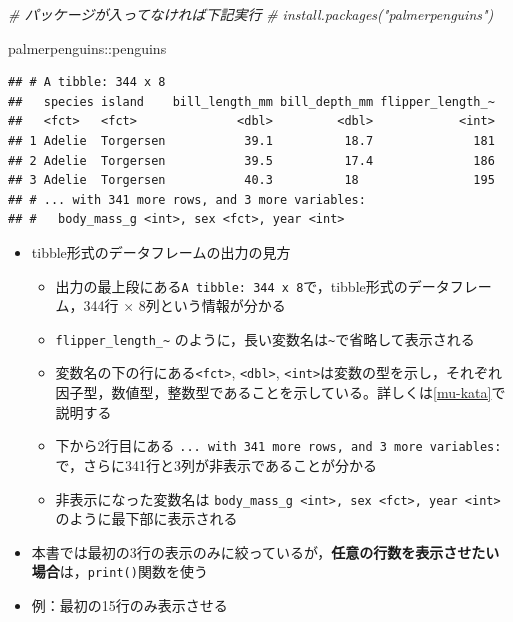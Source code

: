 \documentclass[
  xelatex,ja=standard, b5paper]{bxjsbook}
\newenvironment{Shaded}{\begin{snugshade}}{\end{snugshade}}
\newcommand{\CommentTok}[1]{\textcolor[rgb]{0.56,0.35,0.01}{\textit{#1}}}
\newcommand{\NormalTok}[1]{#1}
\newcommand{\SpecialCharTok}[1]{\textcolor[rgb]{0.00,0.00,0.00}{#1}}
\providecommand{\tightlist}{%
  \setlength{\itemsep}{0pt}\setlength{\parskip}{0pt}}
\begin{document}
\begin{Shaded}
\begin{Highlighting}[]
\CommentTok{\# パッケージが入ってなければ下記実行}
\CommentTok{\# install.packages("palmerpenguins")}

\NormalTok{palmerpenguins}\SpecialCharTok{::}\NormalTok{penguins}
\end{Highlighting}
\end{Shaded}

\begin{verbatim}
## # A tibble: 344 x 8
##   species island    bill_length_mm bill_depth_mm flipper_length_~
##   <fct>   <fct>              <dbl>         <dbl>            <int>
## 1 Adelie  Torgersen           39.1          18.7              181
## 2 Adelie  Torgersen           39.5          17.4              186
## 3 Adelie  Torgersen           40.3          18                195
## # ... with 341 more rows, and 3 more variables:
## #   body_mass_g <int>, sex <fct>, year <int>
\end{verbatim}

\begin{itemize}
\tightlist
\item
  tibble形式のデータフレームの出力の見方

  \begin{itemize}
  \tightlist
  \item
    出力の最上段にある\texttt{A\ tibble:\ 344\ x\ 8}で，tibble形式のデータフレーム，344行 × 8列という情報が分かる
  \item
    \texttt{flipper\_length\_\textasciitilde{}} のように，長い変数名は\texttt{\textasciitilde{}}で省略して表示される
  \item
    変数名の下の行にある\texttt{\textless{}fct\textgreater{}}, \texttt{\textless{}dbl\textgreater{}}, \texttt{\textless{}int\textgreater{}}は変数の型を示し，それぞれ因子型，数値型，整数型であることを示している。詳しくは\ref{mu-kata}で説明する
  \item
    下から2行目にある
    \texttt{...\ with\ 341\ more\ rows,\ and\ 3\ more\ variables:}
    で，さらに341行と3列が非表示であることが分かる
  \item
    非表示になった変数名は
    \texttt{body\_mass\_g\ \textless{}int\textgreater{},\ sex\ \textless{}fct\textgreater{},\ year\ \textless{}int\textgreater{}}
    のように最下部に表示される
  \end{itemize}
\item
  本書では最初の3行の表示のみに絞っているが，\textbf{任意の行数を表示させたい場合}は，\texttt{print()}関数を使う
\item
  例：最初の15行のみ表示させる
\end{itemize}
\end{document}
